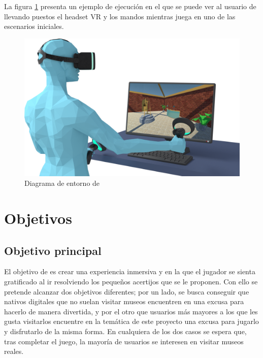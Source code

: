 La figura \ref{fig:entorno} presenta un ejemplo de ejecución en el que se puede ver al usuario de \MineRVa llevando puestos el headset \acs{VR} y los mandos mientras juega en uno de las escenarios iniciales.

\vspace{0.4cm}

\begin{figure}[!h]
\begin{center}
\includegraphics[width=1\textwidth]{imagenes/1/entorno-diffuse-2.png}
\caption{Diagrama de entorno de \MineRVa}
\label{fig:entorno}
\end{center}
\end{figure}

\section{Objetivos}

\subsection{Objetivo principal}

El objetivo de \MineRVa es crear una experiencia inmersiva y en la que el jugador se sienta gratificado al ir resolviendo los pequeños acertijos que se le proponen. Con ello se pretende alcanzar dos objetivos diferentes; por un lado, se busca conseguir que nativos digitales que no suelan visitar museos encuentren en \MineRVa una excusa para hacerlo de manera divertida, y por el otro que usuarios más mayores a los que les gusta visitarlos encuentre en la temática de este proyecto una excusa para jugarlo y disfrutarlo de la misma forma. En cualquiera de los dos casos se espera que, tras completar el juego, la mayoría de usuarios se interesen en visitar museos reales.

